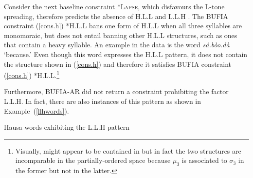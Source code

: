 \documentclass{CUP-JNL-PHO}%
\theoremstyle{definition}
\numberwithin{equation}{section}
\theoremstyle{definition}
\begin{document}
Consider the next baseline constraint \textsc{*Lapse}, which disfavours
the L-tone spreading, therefore predicts the absence of H.L.L and L.L.H 
\citep{zoll2003optimal}. The BUFIA constraint
(\ref{cons.h}) *H.L.L bans one form of H.L.L when all three syllables
are monomoraic, but does not entail banning other H.L.L structures, 
such as ones that contain a heavy syllable. An
example in the data is the word \textit{sá.bòo.dà} `because.' Even
though this word expresses the H.L.L pattern, it does not contain the
structure shown in (\ref{cons.h}) and therefore it satisfies BUFIA
constraint (\ref{cons.h}) *H.L.L.\footnote{Visually, 
	might appear to be contained in
	but in fact the two structures are incomparable in the partially-ordered
	space because \(\mu_3\) is associated to \(\sigma_3\) in the former
	but not in the latter.}

Furthermore, BUFIA-AR did not return a constraint prohibiting the
factor L.L.H. In fact, there are also instances of this pattern as
shown in Example~(\ref{llhwords}). 

\ea Hausa words exhibiting the L.L.H pattern
\label{llhwords}
\end{document}
